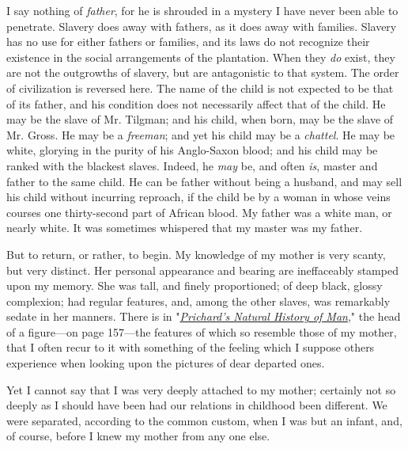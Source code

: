 I say nothing of \emph{father}, for he is shrouded in a mystery I have
never been able to penetrate. Slavery does away with fathers, as it does
away with families. Slavery has no use for either fathers or families,
and its laws do not recognize their existence in the social arrangements
of the plantation. When they \emph{do} exist, they are not the
outgrowths of slavery, but are antagonistic to that system. The order of
civilization is reversed here. The name of the child is not expected to
be that of its father, and his {\protect\hypertarget{52}{}{}}condition
does not necessarily affect that of the child. He may be the slave of
Mr. Tilgman; and his child, when born, may be the slave of Mr. Gross. He
may be a \emph{freeman}; and yet his child may be a \emph{chattel}. He
may be white, glorying in the purity of his Anglo-Saxon blood; and his
child may be ranked with the blackest slaves. Indeed, he \emph{may} be,
and often \emph{is}, master and father to the same child. He can be
father without being a husband, and may sell his child without incurring
reproach, if the child be by a woman in whose veins courses one
thirty-second part of African blood. My father was a white man, or
nearly white. It was sometimes whispered that my master was my father.

But to return, or rather, to begin. My knowledge of my mother is very
scanty, but very distinct. Her personal appearance and bearing are
ineffaceably stamped upon my memory. She was tall, and finely
proportioned; of deep black, glossy complexion; had regular features,
and, among the other slaves, was remarkably sedate in her manners. There
is in
"\emph{\href{/w/index.php?title=The_Natural_History_of_Man_(Prichard)\&action=edit\&redlink=1}{Prichard's
Natural History of Man}}," the head of a figure---on page 157---the
features of which so resemble those of my mother, that I often recur to
it with something of the feeling which I suppose others experience when
looking upon the pictures of dear departed ones.

Yet I cannot say that I was very deeply attached to my mother; certainly
not so deeply as I should have been had our relations in childhood been
different. We were separated, according to the common custom, when I was
but an infant, and, of course, before I knew my mother from any one
else.

